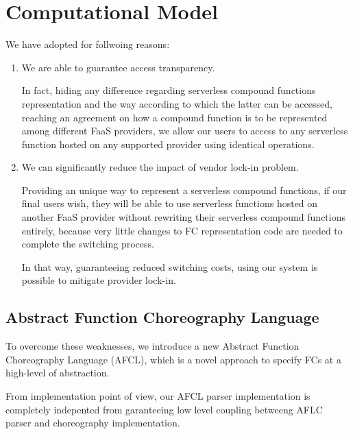 \documentclass[10pt,a4paper]{report}
\theoremstyle{definition}
\begin{document}
\newpage


\chapter{Computational Model}






We have adopted for follwoing reasons:

\begin{enumerate}
	\item We are able to guarantee access transparency. 
	
	In fact, hiding any difference regarding serverless compound functions representation and the way according to which the latter can be accessed, reaching an agreement on how a compound function is to be represented among different FaaS providers, we allow our users to access to any serverless function hosted on any supported provider using identical operations.
	
	\item We can significantly reduce the impact of vendor lock-in problem. 
	
	Providing an unique way to represent a serverless compound functions, if our final users wish, they will be able to use serverless functions hosted on another FaaS provider without rewriting their serverless compound functions entirely, because very little changes to FC representation code are needed to complete the switching process. 
	
	In that way, guaranteeing reduced switching costs, using our system is possible to mitigate provider lock-in.
	
\end{enumerate}

\section{Abstract Function Choreography Language}

To overcome these weaknesses, we introduce a new Abstract
Function Choreography Language (AFCL), which is a novel approach
to specify FCs at a high-level of abstraction. 



From implementation point of view, our AFCL parser implementation is completely indepented from 
garanteeing low level coupling betweeng AFLC parser and choreography implementation.
\end{document}
